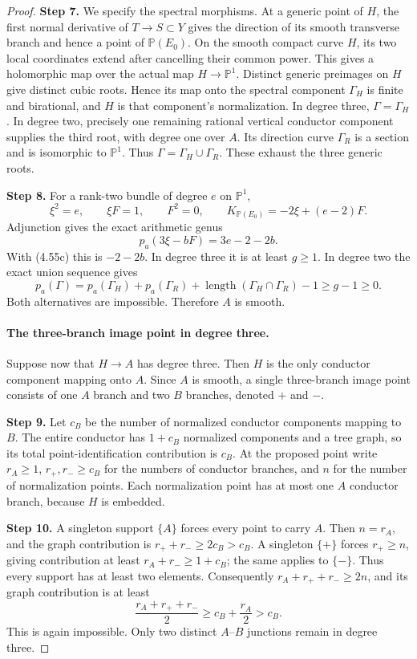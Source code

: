 \begin{proof}
\noindent\textbf{Step 7.} We specify the spectral morphisms. At a generic point of
$H$, the first normal derivative of $T\to S\subset Y$
gives the direction of its smooth transverse branch and
hence a point of $\mathbb P(E_0)$. On the smooth compact
curve $H$, its two local coordinates extend after cancelling
their common power. This gives a holomorphic map over the
actual map $H\to\mathbb P^1$. Distinct generic preimages
on $H$ give distinct cubic roots. Hence its map onto the
spectral component $\Gamma_H$ is finite and birational,
and $H$ is that component's normalization. In degree three,
$\Gamma=\Gamma_H$. In degree two, precisely one remaining
rational vertical conductor component supplies the third
root, with degree one over $A$. Its direction curve
$\Gamma_R$ is a section and is isomorphic to $\mathbb P^1$.
Thus $\Gamma=\Gamma_H\cup\Gamma_R$. These exhaust the
three generic roots.

\noindent\textbf{Step 8.} For a rank-two bundle of degree $e$ on $\mathbb P^1$,
\[
 \xi^2=e,\qquad \xi F=1,\qquad F^2=0,\qquad
 K_{\mathbb P(E_0)}=-2\xi+(e-2)F.
\]
Adjunction gives the exact arithmetic genus
\[
                    p_a(3\xi-bF)=3e-2-2b.               \tag{4.55d}
\]
With (4.55c) this is $-2-2b$. In degree three it is at
least $g\ge1$. In degree two the exact union sequence gives
\[
 p_a(\Gamma)=p_a(\Gamma_H)+p_a(\Gamma_R)
           +\operatorname{length}(\Gamma_H\cap\Gamma_R)-1
       \ge g-1\ge0.
\]
Both alternatives are impossible. Therefore $A$ is smooth.

\paragraph{The three-branch image point in degree three.}
Suppose now that $H\to A$ has degree three. Then $H$ is
the only conductor component mapping onto $A$. Since $A$
is smooth, a single three-branch image point consists of
one $A$ branch and two $B$ branches, denoted $+$ and $-$.

\noindent\textbf{Step 9.} Let $c_B$ be the number of normalized conductor components
mapping to $B$. The entire conductor has $1+c_B$
normalized components and a tree graph, so its total
point-identification contribution is $c_B$. At the proposed
point write $r_A\ge1$, $r_+,r_-\ge c_B$ for the numbers
of conductor branches, and $n$ for the number of normalization
points. Each normalization point has at most one $A$
conductor branch, because $H$ is embedded.

\noindent\textbf{Step 10.} A singleton support $\{A\}$ forces every point to carry
$A$. Then $n=r_A$, and the graph contribution is
$r_++r_-\ge2c_B>c_B$. A singleton $\{+\}$ forces
$r_+\ge n$, giving contribution at least
$r_A+r_-\ge1+c_B$; the same applies to $\{-\}$.
Thus every support has at least two elements. Consequently
$r_A+r_++r_-\ge2n$, and its graph contribution is at least
\[
       \frac{r_A+r_++r_-}{2}
                         \ge c_B+\frac{r_A}{2}>c_B.
\]
This is again impossible. Only two distinct $A$--$B$
junctions remain in degree three.


\end{proof}
